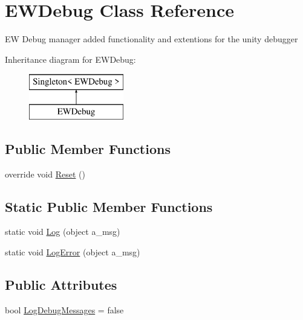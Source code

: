 \hypertarget{class_e_w_debug}{}\section{E\+W\+Debug Class Reference}
\label{class_e_w_debug}


EW Debug manager added functionality and extentions for the unity debugger  


Inheritance diagram for E\+W\+Debug\+:\begin{figure}[H]
\begin{center}
\leavevmode
\includegraphics[height=2.000000cm]{class_e_w_debug}
\end{center}
\end{figure}
\subsection*{Public Member Functions}
\begin{DoxyCompactItemize}
\item 
override void \mbox{\hyperlink{class_e_w_debug_aac177b62905530131ea9a05026f95725}{Reset}} ()
\end{DoxyCompactItemize}
\subsection*{Static Public Member Functions}
\begin{DoxyCompactItemize}
\item 
static void \mbox{\hyperlink{class_e_w_debug_a2e7779959df523149c9f9a45d44dcb42}{Log}} (object a\+\_\+msg)
\item 
static void \mbox{\hyperlink{class_e_w_debug_abe53107ec02cd3b08cd5825a53d29183}{Log\+Error}} (object a\+\_\+msg)
\end{DoxyCompactItemize}
\subsection*{Public Attributes}
\begin{DoxyCompactItemize}
\item 
bool \mbox{\hyperlink{class_e_w_debug_a7402f5700ecb03b56bf3948419f0ffcd}{Log\+Debug\+Messages}} = false
\end{DoxyCompactItemize}
